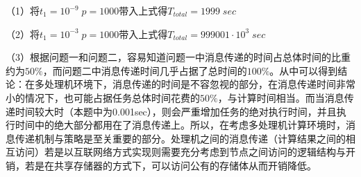 \documentclass[12pt]{article}
\begin{document}
	（1）将$t_1=10^{-9}\;p=1000$带入上式得$T_{total}=1999\;sec$
	
	（2）将$t_1=10^{-3}\;p=1000$带入上式得$T_{total}=999001\cdot10^{3}\;sec$
	
	（3）根据问题一和问题二，容易知道问题一中消息传递的时间占总体时间的比重约为$
	50\%$，而问题二中消息传递时间几乎占据了总时间的$100\%$。从中可以得到结论：在多处理机环境下，消息传递的时间是不容忽视的部分，在消息传递时间非常小的情况下，也可能占据任务总体时间花费的$50\%$，与计算时间相当。而当消息传递时间较大时（本题中为0.001sec），则会严重增加任务的绝对执行时间，并且执行时间中的绝大部分都用在了消息传递上。所以，在考虑多处理机计算环境时，消息传递机制与策略是至关重要的部分。处理机之间的消息传递（计算结果之间的相互访问）若是以互联网络方式实现则需要充分考虑到节点之间访问的逻辑结构与开销，若是在共享存储器的方式下，可以访问公有的存储体从而开销降低。
\end{document}
